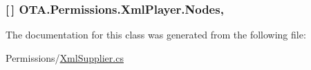 \subsubsection[{Nodes}]{ \mbox{[}$\,$\mbox{]} O\+T\+A.\+Permissions.\+Xml\+Player.\+Nodes\hspace{0.3cm}{\ttfamily [get]}, {\ttfamily [set]}}\label{class_o_t_a_1_1_permissions_1_1_xml_player_a2e8ab55e85850bcfd352238ffe1a97d6}


The documentation for this class was generated from the following file\+:\begin{DoxyCompactItemize}
\item 
Permissions/\hyperlink{_xml_supplier_8cs}{Xml\+Supplier.\+cs}\end{DoxyCompactItemize}
